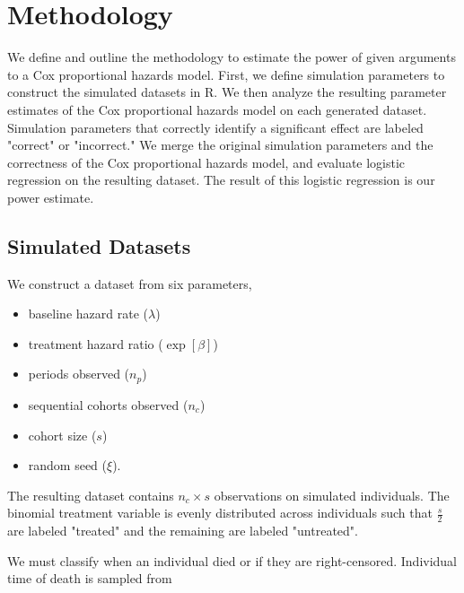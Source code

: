 \section{Methodology}
\label{sec:methodology}

We define and outline the methodology to estimate the power of given arguments to a Cox proportional hazards model. First, we define simulation parameters to construct the simulated datasets in R. We then analyze the resulting parameter estimates of the Cox proportional hazards model on each generated dataset. Simulation parameters that correctly identify a significant effect are labeled "correct" or "incorrect." We merge the original simulation parameters and the correctness of the Cox proportional hazards model, and evaluate logistic regression on the resulting dataset. The result of this logistic regression is our power estimate.


\subsection{Simulated Datasets}

We construct a dataset from six parameters\footnotemark,


\begin{itemize}
    \item baseline hazard rate ($\lambda$)
    \item treatment hazard ratio ($\exp[\beta]$)
    \item periods observed ($n_p$)
    \item sequential cohorts observed ($n_c$)
    \item cohort size ($s$)
    \item random seed ($\xi$).
\end{itemize}

The resulting dataset contains $n_c \times s$ observations on simulated individuals. The binomial treatment variable is evenly distributed across individuals such that $\frac{s}{2}$ are labeled "treated" and the remaining are labeled "untreated".

We must classify when an individual died or if they are right-censored. Individual time of death is sampled from\footnotemark \cite{agresti:categorical}

